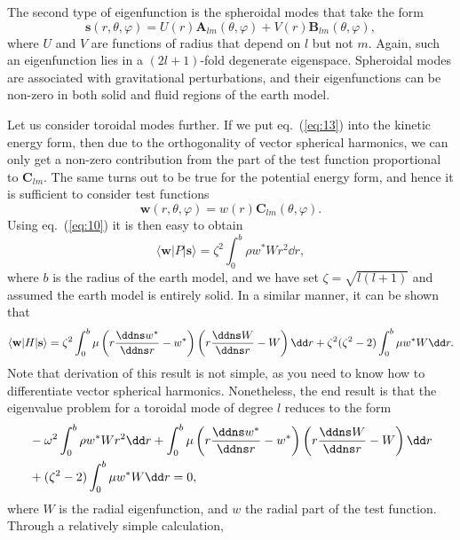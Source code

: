 The second type of eigenfunction is the spheroidal modes that take the form
\begin{equation}\label{eq:14}
\mathbf{s}(r,\theta,\varphi)=U(r)\mathbf{A}_{lm}(\theta,\varphi)+V(r)\mathbf{B}_{lm}(\theta,\varphi),
\end{equation}
where $U$ and $V$ are functions of radius that depend on $l$ but not $m$.
Again, such an eigenfunction lies in a $(2l+1)$-fold degenerate eigenspace. Spheroidal modes 
are associated with gravitational perturbations, and their eigenfunctions can be non-zero in 
both solid and fluid regions of the earth model.

Let us consider toroidal modes further. If we put eq.~(\ref{eq:13}) into the kinetic energy form, then due to the orthogonality 
of vector spherical harmonics, we can only get a non-zero contribution from the part of the test function proportional 
to $\mathbf{C}_{lm}$. The same turns out to be true for the potential energy form, and hence it is sufficient 
to consider test functions
\begin{equation}\label{eq:15}
\mathbf{w}(r,\theta,\varphi)=w(r)\mathbf{C}_{lm}(\theta,\varphi).
\end{equation}
Using eq.~(\ref{eq:10}) it is then easy to obtain
\begin{equation}\label{eq:16}
\langle \mathbf{w}|P|\mathbf{s}\rangle=\zeta^{2}\int_{0}^{b}\rho w^{*}Wr^{2}\dd r,
\end{equation}
where $b$ is the radius of the earth model, and we have set $\zeta=\sqrt{l(l+1)}$ and assumed the earth model is entirely solid. 
In a similar manner, it can be shown that
\begin{equation}\label{eq:17}
\langle \mathbf{w}|H|\mathbf{s}\rangle=\zeta^{2}\int_{0}^{b}\mu\left(r\frac{\ddns w^{*}}{\ddns r}-w^{*}\right)\left(r\frac{\ddns W}{\ddns r}-W\right)\dd r+\zeta^{2}(\zeta^{2}-2)\int_{0}^{b}\mu w^{*}W\dd r.
\end{equation}
Note that derivation of this result is not simple, as you need to know how to differentiate vector spherical harmonics. 
Nonetheless, the end result is that the eigenvalue problem for a toroidal mode of degree $l$ reduces to the form
\begin{align}
&-\omega^{2}\int_{0}^{b}\rho w^{*}Wr^{2}\dd r+\int_{0}^{b}\mu\left(r\frac{\ddns w^{*}}{\ddns r}-w^{*}\right)\left(r\frac{\ddns W}{\ddns r}-W\right)\dd r\nonumber \\ &+(\zeta^{2}-2)\int_{0}^{b}\mu w^{*}W\dd r=0,\label{eq:18}
\end{align}
where $W$ is the radial eigenfunction, and $w$ the radial part of the test function. Through a relatively simple calculation, 
